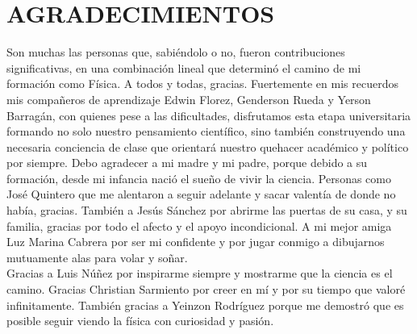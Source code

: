 \newpage
\chapter*{AGRADECIMIENTOS}
\label{sec:resum}

Son muchas las personas que, sabiéndolo o no, fueron contribuciones significativas, en una combinación lineal que determinó el camino de mi formación como Física. A todos y todas, gracias. Fuertemente en mis recuerdos mis compañeros de aprendizaje Edwin Florez, Genderson Rueda y Yerson Barragán, con quienes pese a las dificultades, disfrutamos esta etapa universitaria formando no solo nuestro pensamiento científico, sino también construyendo una necesaria conciencia de clase que orientará nuestro quehacer académico y político por siempre. Debo agradecer a mi madre y mi padre, porque debido a su formación, desde mi infancia nació el sueño de vivir la ciencia. Personas como José Quintero que me alentaron a seguir adelante y sacar valentía de donde no había, gracias. También a Jesús Sánchez por abrirme las puertas de su casa, y su familia, gracias por todo el afecto y el apoyo incondicional. A mi mejor amiga Luz Marina Cabrera por ser mi confidente y por jugar conmigo a dibujarnos mutuamente alas para volar y soñar.\\ 

Gracias a Luis Núñez por inspirarme siempre y mostrarme que la ciencia es el camino. Gracias Christian Sarmiento por creer en mí y por su tiempo que valoré infinitamente. También gracias a Yeinzon Rodríguez porque me demostró que es posible seguir viendo la física con curiosidad y pasión.\\
